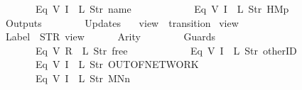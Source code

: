 \begin{isabellebody}
\ \ \ \ \ \ \ \ \ \ \ \ Eq\ {\isacharparenleft}V\ {\isacharparenleft}I\ {}{\isacharparenright}{\isacharparenright}\ {\isacharparenleft}L\ {\isacharparenleft}Str\ {\isacharprime}{\isacharprime}name{\isacharprime}{\isacharprime}{\isacharparenright}{\isacharparenright}{\isacharcomma}\isanewline
\ \ \ \ \ \ \ \ \ \ \ \ Eq\ {\isacharparenleft}V\ {\isacharparenleft}I\ {}{\isacharparenright}{\isacharparenright}\ {\isacharparenleft}L\ {\isacharparenleft}Str\ {\isacharprime}{\isacharprime}HM{}p{\isacharprime}{\isacharprime}{\isacharparenright}{\isacharparenright}\isanewline
\ \ \ \ \ \ {\isacharbrackright}{\isacharcomma}\isanewline
\ \ \ \ \ \ Outputs\ {\isacharequal}\ {\isacharbrackleft}{\isacharbrackright}{\isacharcomma}\isanewline
\ \ \ \ \ \ Updates\ {\isacharequal}\ {\isacharbrackleft}{\isacharbrackright}\isanewline
{\isasymrparr}{\isachardoublequoteclose}\isanewline
\isanewline
{}\isamarkupfalse%
\ {\isachardoublequoteopen}view{}{\isachardoublequoteclose}\ {\isacharcolon}{\isacharcolon}\ {\isachardoublequoteopen}transition{\isachardoublequoteclose}\ \isanewline
{\isachardoublequoteopen}view{}\ {\isasymequiv}\ {\isasymlparr}\isanewline
\ \ \ \ \ \ Label\ {\isacharequal}\ STR\ {\isacharprime}{\isacharprime}view{\isacharprime}{\isacharprime}{\isacharcomma}\isanewline
\ \ \ \ \ \ Arity\ {\isacharequal}\ {}{\isacharcomma}\isanewline
\ \ \ \ \ \ Guards\ {\isacharequal}\ {\isacharbrackleft}\isanewline
\ \ \ \ \ \ \ \ \ \ \ \ Eq\ {\isacharparenleft}V\ {\isacharparenleft}R\ {}{\isacharparenright}{\isacharparenright}\ {\isacharparenleft}L\ {\isacharparenleft}Str\ {\isacharprime}{\isacharprime}free{\isacharprime}{\isacharprime}{\isacharparenright}{\isacharparenright}{\isacharcomma}\isanewline
\ \ \ \ \ \ \ \ \ \ \ \ Eq\ {\isacharparenleft}V\ {\isacharparenleft}I\ {}{\isacharparenright}{\isacharparenright}\ {\isacharparenleft}L\ {\isacharparenleft}Str\ {\isacharprime}{\isacharprime}otherID{\isacharprime}{\isacharprime}{\isacharparenright}{\isacharparenright}{\isacharcomma}\isanewline
\ \ \ \ \ \ \ \ \ \ \ \ Eq\ {\isacharparenleft}V\ {\isacharparenleft}I\ {}{\isacharparenright}{\isacharparenright}\ {\isacharparenleft}L\ {\isacharparenleft}Str\ {\isacharprime}{\isacharprime}OUT{\isacharunderscore}OF{\isacharunderscore}NETWORK{\isacharprime}{\isacharprime}{\isacharparenright}{\isacharparenright}{\isacharcomma}\isanewline
\ \ \ \ \ \ \ \ \ \ \ \ Eq\ {\isacharparenleft}V\ {\isacharparenleft}I\ {}{\isacharparenright}{\isacharparenright}\ {\isacharparenleft}L\ {\isacharparenleft}Str\ {\isacharprime}{\isacharprime}MNn{}{\isacharprime}{\isacharprime}{\isacharparenright}{\isacharparenright}\isanewline

\end{isabellebody}
